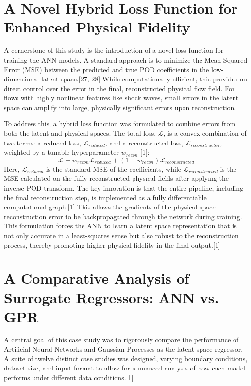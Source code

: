 \documentclass[12pt, a4paper]{report}
\begin{document}
\section{A Novel Hybrid Loss Function for Enhanced Physical Fidelity}

A cornerstone of this study is the introduction of a novel loss function for training the ANN models. A standard approach is to minimize the Mean Squared Error (MSE) between the predicted and true POD coefficients in the low-dimensional latent space.[27, 28] While computationally efficient, this provides no direct control over the error in the final, reconstructed physical flow field. For flows with highly nonlinear features like shock waves, small errors in the latent space can amplify into large, physically significant errors upon reconstruction.

To address this, a hybrid loss function was formulated to combine errors from both the latent and physical spaces. The total loss, $\mathcal{L}$, is a convex combination of two terms: a reduced loss, $\mathcal{L}_{reduced}$, and a reconstructed loss, $\mathcal{L}_{reconstructed}$, weighted by a tunable hyperparameter $w_{recon}$ [1]:
$$\mathcal{L} = w_{recon}\mathcal{L}_{reduced} + (1 - w_{recon})\mathcal{L}_{reconstructed}$$
Here, $\mathcal{L}_{reduced}$ is the standard MSE of the coefficients, while $\mathcal{L}_{reconstructed}$ is the MSE calculated on the fully reconstructed physical fields after applying the inverse POD transform. The key innovation is that the entire pipeline, including the final reconstruction step, is implemented as a fully differentiable computational graph.[1] This allows the gradients of the physical-space reconstruction error to be backpropagated through the network during training. This formulation forces the ANN to learn a latent space representation that is not only accurate in a least-squares sense but also robust to the reconstruction process, thereby promoting higher physical fidelity in the final output.[1]

\section{A Comparative Analysis of Surrogate Regressors: ANN vs. GPR}

A central goal of this case study was to rigorously compare the performance of Artificial Neural Networks and Gaussian Processes as the latent-space regressor. A suite of twelve distinct case studies was designed, varying boundary conditions, dataset size, and input format to allow for a nuanced analysis of how each model performs under different data conditions.[1]
\end{document}
